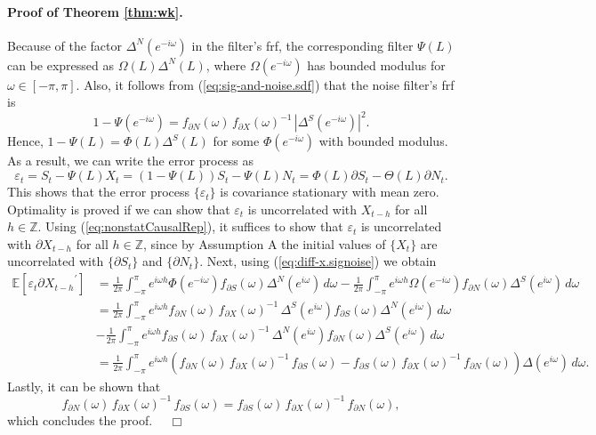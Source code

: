 \documentclass[a4paper]{book}
\def\ZZ{\mathbb Z}
\def\EE{\mathbb E}
\begin{document}
 
\paragraph{Proof of Theorem \ref{thm:wk}.} 
 Because of the factor $\Delta^N (e^{-i \omega})$  in the filter's frf,
  the corresponding filter $\Psi (L)$ can be expressed as
  $\Omega (L) \Delta^N (L)$, where $\Omega (e^{-i \omega})$ has bounded modulus
   for $\omega \in [-\pi, \pi]$.  Also, it follows from
   (\ref{eq:sig-and-noise.sdf}) that the noise filter's frf is
\[
 1 - \Psi (e^{-i \omega}) = f_{\partial N} (\omega) \, 
    { f_{\partial X} (\omega) }^{-1} \, {| \Delta^S (e^{-i \omega}) |}^2.
\]
 Hence, $1 - \Psi (L) = \Phi (L) \Delta^S (L)$ for some $\Phi (e^{-i \omega})$
 with bounded modulus.  As a result, we can write the error process as
\[
 \varepsilon_t = S_t - \Psi (L) X_t = (1 - \Psi (L)) S_t - \Psi (L) N_t 
  = \Phi (L) \partial S_t - \Theta (L) \partial N_t.
\]
 This shows that the error process $\{ \varepsilon_t \}$ is covariance stationary
  with mean zero.   Optimality is proved if we can show that $\varepsilon_t$
  is uncorrelated with $X_{t-h}$ for all $h \in \ZZ$.  
 Using (\ref{eq:nonstatCausalRep}), it suffices to show that $\varepsilon_t$
  is uncorrelated with $\partial X_{t-h}$ for all $h \in \ZZ$, since by Assumption
  A the initial values of $\{ X_t \}$ are uncorrelated with $\{ \partial S_t \}$ and
   $\{ \partial N_t \}$.  Next, using (\ref{eq:diff-x.signoise}) we obtain
\begin{align*}
  \EE [ \varepsilon_t { \partial X_{t-h}}^{\prime} ]
  & = \frac{1}{2\pi} \int_{-\pi}^{\pi}  e^{i \omega h} \Phi (e^{-i \omega})
    f_{\partial S} (\omega) \Delta^N (e^{i \omega}) \, d\omega
    - \frac{1}{2\pi} \int_{-\pi}^{\pi}  e^{i \omega h} \Omega (e^{-i \omega})
    f_{\partial N} (\omega) \Delta^S (e^{i \omega}) \, d\omega  \\
  & = \frac{1}{2\pi} \int_{-\pi}^{\pi}  e^{i \omega h}
    f_{\partial N} (\omega) \, 
    { f_{\partial X} (\omega) }^{-1} \,  \Delta^S (e^{i \omega})
      f_{\partial S} (\omega) \Delta^N (e^{i \omega}) \, d\omega \\
    &  - \frac{1}{2\pi} \int_{-\pi}^{\pi}  e^{i \omega h}
            f_{\partial S} (\omega) \, 
    { f_{\partial X} (\omega) }^{-1} \,  \Delta^N (e^{i \omega})
      f_{\partial N} (\omega) \Delta^S (e^{i \omega}) \, d\omega  \\
  & =    \frac{1}{2\pi} \int_{-\pi}^{\pi}  e^{i \omega h} \left(
     f_{\partial N} (\omega) \, { f_{\partial X} (\omega) }^{-1} \,  
     f_{\partial S} (\omega)   
   -  f_{\partial S} (\omega) \, 
    { f_{\partial X} (\omega) }^{-1} \,  
      f_{\partial N} (\omega) \right) \Delta (e^{i \omega}) \, d\omega.
\end{align*}
 Lastly, it can be shown that
\[ f_{\partial N} (\omega) \, { f_{\partial X} (\omega) }^{-1} \,  
     f_{\partial S} (\omega) = f_{\partial S} (\omega) \, 
    { f_{\partial X} (\omega) }^{-1} \,  
      f_{\partial N} (\omega),
\]
 which concludes the proof.  $\quad \Box$
\end{document}
